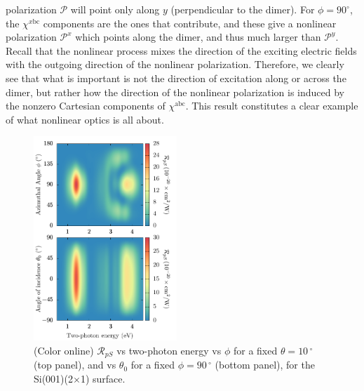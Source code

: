 \documentclass[aps,prb,10pt,showpacs,letterpaper,twocolumn]{revtex4-1}
\begin{document}
polarization $\boldsymbol{\mathcal{P}}$ will point only along $y$ (perpendicular
to the dimer). For $\phi=90^\circ$, the $\chi^{x\mathrm{bc}}$ components are the
ones that contribute, and these give a nonlinear polarization $\mathcal{P}^{x}$
which points along the dimer, and thus much larger than $\mathcal{P}^{y}$.
Recall that the nonlinear process mixes the direction of the exciting electric
fields with the outgoing direction of the nonlinear polarization. Therefore, we
clearly see that what is important is not the direction of excitation along or
across the dimer, but rather how the direction of the nonlinear polarization is
induced by the nonzero Cartesian components of $\chi^{\mathrm{abc}}$. This
result constitutes a clear example of what nonlinear optics is all about.

\begin{figure}[t]
\includegraphics[width=0.48\textwidth]{fig6}
\caption{(Color online) $\mathcal{R}_{pS}$ vs two-photon energy vs $\phi$ for a
fixed $\theta = 10\,^{\circ}$ (top panel), and vs $\theta_{0}$ for a fixed $\phi
= 90\,^{\circ}$ (bottom panel), for the Si(001)(2$\times$1) surface.}
\label{fig:maps}
\end{figure}
\end{document}
